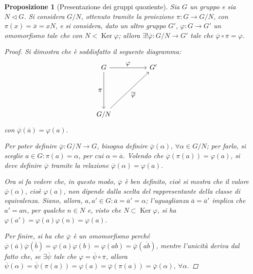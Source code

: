 \documentclass[11pt]{scrartcl}
\theoremstyle{style1}
\newtheorem{prop}{Proposizione}[section]
\numberwithin{equation}{subsection}
\begin{document}
\begin{prop}
	[Presentazione dei gruppi quoziente]
	Sia $G$ un gruppo e sia $N \lhd G$. 
	Si considera $G / N$, ottenuto tramite la proiezione $\pi : G \to G / N$, con $\pi(x) = \overline{x}=x N$, e si considera, dato un altro gruppo $G'$, $\varphi :G \to G'$ un omomorfismo tale che con $N < \operatorname{Ker} \varphi $; allora $\exists ! \overline{\varphi }: G / N \to G '$ tale che $\overline{\varphi }\circ \pi = \varphi $.
\begin{proof}
	Si dimostra che \`e soddisfatto il seguente diagramma:
	\[
	\begin{tikzcd}
		G & & G '\\
		\\
		\\
		 G / N
		\arrow[from=1-1, to=1-3, "\displaystyle \varphi "]
		\arrow[from=1-1, to=4-1, "\displaystyle \pi"']
		\arrow[from=4-1, to=1-3, "\displaystyle \overline{\varphi}"']
	\end{tikzcd}
	\] 
	con $\overline{\varphi }(\overline{a}) = \varphi (a)$.

	Per poter definire $\overline{\varphi } : G / N \to G$, bisogna definire $\overline{\varphi }(\alpha ), \ \forall \alpha \in G / N$; per farlo, si sceglie $a \in G : \pi (a) = \alpha $, per cui $\alpha  = \overline{a}$. 
	Volendo che $\overline{\varphi }(\pi(a)) = \varphi (a)$, si deve definire $\overline{\varphi }$ tramite la relazione $\overline{\varphi }(\alpha ) = \varphi (a)$.

	Ora si fa vedere che, in questo modo, $\overline{\varphi }$ \`e ben definito, cio\`e si mostra che il valore $\overline{\varphi }(\alpha )$, cio\`e $\varphi (a)$, non dipende dalla scelta del rappresentante della classe di equivalenza.
	Siano, allora, $a,a' \in G : \overline{a}= \overline{a}' = \alpha $; l'uguaglianza $\overline{a}=\overline{a}'$ implica che $a' = an$, per qualche $n \in N$ e, visto che $N\subset\operatorname{Ker} \varphi $, si ha $\varphi (a')=\varphi (a)\varphi (n)=\varphi (a)$.

	Per finire, si ha che $\overline{\varphi }$ \`e un omomorfismo perch\'e $\overline{\varphi }(\overline{a})\overline{\varphi }(\overline{b}) = \varphi (a)\varphi (b) = \varphi (ab) = \overline{\varphi }(\overline{ab})$, mentre l'unicit\`a deriva dal fatto che, se $\exists \overline{\psi }$ tale che $\varphi = \overline{\psi }\circ\pi$, allora $\overline{\psi }(\alpha ) = \overline{\psi }(\pi(a)) = \varphi (a) = \overline{\varphi }(\pi(a))=\overline{\varphi }(\alpha ), \ \forall \alpha $.
\end{proof}
\end{prop}
\end{document}
